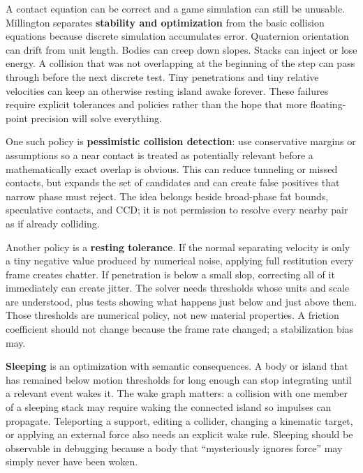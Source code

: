 \hypertarget{06-engine-ii-ch046-a-contact-solver-needs-a-stability-policy-not-only-correct-equations}{}

A contact equation can be correct and a game simulation can still be unusable. Millington separates \textbf{stability and optimization} from the basic collision equations because discrete simulation accumulates error. Quaternion orientation can drift from unit length. Bodies can creep down slopes. Stacks can inject or lose energy. A collision that was not overlapping at the beginning of the step can pass through before the next discrete test. Tiny penetrations and tiny relative velocities can keep an otherwise resting island awake forever. These failures require explicit tolerances and policies rather than the hope that more floating-point precision will solve everything.

One such policy is \textbf{pessimistic collision detection}: use conservative margins or assumptions so a near contact is treated as potentially relevant before a mathematically exact overlap is obvious. This can reduce tunneling or missed contacts, but expands the set of candidates and can create false positives that narrow phase must reject. The idea belongs beside broad-phase fat bounds, speculative contacts, and CCD; it is not permission to resolve every nearby pair as if already colliding.

Another policy is a \textbf{resting tolerance}. If the normal separating velocity is only a tiny negative value produced by numerical noise, applying full restitution every frame creates chatter. If penetration is below a small slop, correcting all of it immediately can create jitter. The solver needs thresholds whose units and scale are understood, plus tests showing what happens just below and just above them. Those thresholds are numerical policy, not new material properties. A friction coefficient should not change because the frame rate changed; a stabilization bias may.

\textbf{Sleeping} is an optimization with semantic consequences. A body or island that has remained below motion thresholds for long enough can stop integrating until a relevant event wakes it. The wake graph matters: a collision with one member of a sleeping stack may require waking the connected island so impulses can propagate. Teleporting a support, editing a collider, changing a kinematic target, or applying an external force also needs an explicit wake rule. Sleeping should be observable in debugging because a body that ``mysteriously ignores force'' may simply never have been woken.

